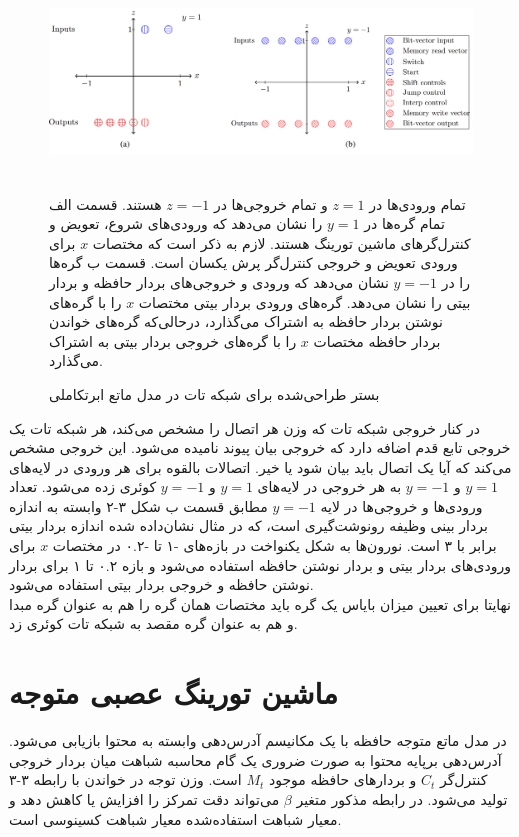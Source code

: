 \begin{figure}[!h]
\begin{center}
\includegraphics[height=5cm]{HyperENTM-Substrate.png}
\end{center}
\caption{بستر طراحی‌شده برای شبکه تات در مدل ماتع ابرتکاملی\cite{merrild2018hyperntm} }
\medskip
\small
تمام ورودی‌ها در $z=1$ و تمام خروجی‌ها در $z=-1$ هستند. قسمت الف تمام گره‌ها در $y=1$ را نشان می‌دهد که ورودی‌های شروع، تعویض و کنترل‌‌گرهای ماشین تورینگ هستند. لازم به ذکر است که مختصات $x$ برای ورودی تعویض و خروجی کنترل‌گر پرش یکسان است.
قسمت ب گره‌ها را در $y=-1‌$ نشان می‌دهد که ورودی و خروجی‌های بردار حافظه و بردار بیتی را نشان می‌دهد. گره‌های ورودی بردار بیتی مختصات $x$ را با گره‌های نوشتن بردار حافظه به اشتراک می‌گذارد، درحالی‌که گره‌های خواندن بردار حافظه مختصات $x$ را با گره‌های خروجی بردار بیتی به اشتراک می‌گذارد.\cite{merrild2018hyperntm}
\end{figure}

در کنار خروجی شبکه تات که وزن هر اتصال را مشخص می‌کند، هر شبکه تات یک خروجی تابع قدم اضافه دارد که خروجی بیان پیوند نامیده می‌شود. این خروجی مشخص می‌کند که آیا یک اتصال باید بیان شود یا خیر. اتصالات بالقوه برای هر ورودی در لایه‌های $y=1$ و $y=-1$ به هر خروجی در لایه‌های $y=1$ و $y=-1‌$ کوئری زده می‌شود. تعداد ورودی‌ها و خروجی‌ها در لایه $y=-1$ مطابق قسمت ب شکل ۳-۲ وابسته به اندازه بردار بینی وظیفه رونوشت‌گیری است، که در مثال نشان‌داده شده اندازه بردار بیتی برابر با ۳ است. نورون‌ها به شکل یکنواخت در بازه‌های -۱ تا -۰.۲ در مختصات $x$ برای ورودی‌های بردار بیتی و بردار نوشتن حافظه استفاده می‌شود و بازه ۰.۲ تا ۱ برای بردار نوشتن حافظه و خروجی بردار بیتی استفاده می‌شود.\cite{merrild2018hyperntm} 
\\

نهایتا برای تعیین میزان بایاس یک گره باید مختصات همان گره را هم به عنوان گره مبدا و هم به عنوان گره مقصد به شبکه تات کوئری زد.\cite{merrild2018hyperntm}

\section{ماشین تورینگ عصبی متوجه}
در مدل ماتع متوجه حافظه با یک مکانیسم آدرس‌دهی وابسته به محتوا بازیابی می‌شود. آدرس‌دهی برپایه محتوا به صورت ضروری یک گام محاسبه شباهت میان بردار خروجی کنترل‌گر $C_t$ و بردارهای حافظه موجود $M_t$ است. وزن توجه در خواندن با رابطه ۳-۳ تولید می‌شود. در رابطه مذکور متغیر $\beta$ می‌تواند دقت تمرکز را افزایش یا کاهش دهد و معیار شباهت استفاده‌شده معیار شباهت کسینوسی است.\cite{zhao2020cold}

